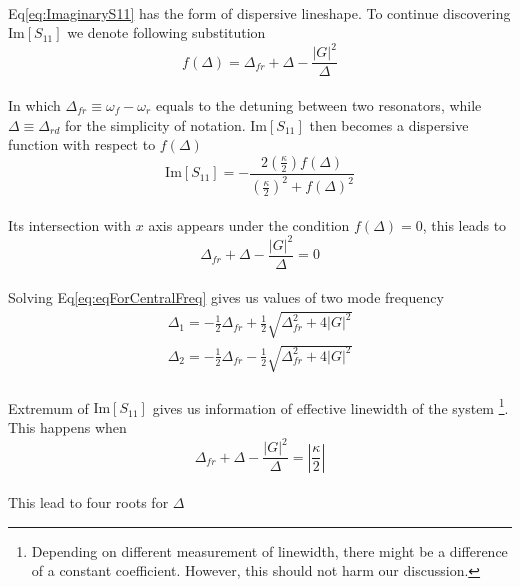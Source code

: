 \\
Eq\ref{eq:ImaginaryS11} has the form of dispersive lineshape. To continue discovering $\mathrm{Im}[S_{11}]$ we denote following substitution
\\
\begin{equation}
	f(\Delta) = \Delta_{fr} + \Delta - \frac{|G|^2}{\Delta}
\end{equation}
\\
In which $\Delta_{fr} \equiv \omega_f - \omega_r$ equals to the detuning between two resonators, while $\Delta \equiv \Delta_{rd}$ for the simplicity of notation. $\mathrm{Im}[S_{11}]$ then becomes a dispersive function with respect to $f(\Delta)$
\\
\begin{equation}
	\mathrm{Im}[S_{11}] = - \frac{2 (\frac{\kappa}{2}) f(\Delta)}{(\frac{\kappa}{2})^2 + f(\Delta)^2}
\end{equation}
\\
Its intersection with $x$ axis appears under the condition $f(\Delta) = 0$, this leads to
\\
\begin{equation}
	\Delta_{fr} + \Delta - \frac{|G|^2}{\Delta} = 0
	\label{eq:eqForCentralFreq}
\end{equation}
\\
Solving Eq\ref{eq:eqForCentralFreq} gives us values of two mode frequency
\\
\begin{equation} \begin{split}
	\Delta_1 = -\frac{1}{2} \Delta_{fr} + \frac{1}{2} \sqrt{\Delta_{fr}^2 + 4|G|^2} \\
	\Delta_2 = -\frac{1}{2} \Delta_{fr} - \frac{1}{2} \sqrt{\Delta_{fr}^2 + 4|G|^2}
	\label{eq:centerSolution}
\end{split} \end{equation}
\\
Extremum of $\mathrm{Im}[S_{11}]$ gives us information of effective linewidth of the system \footnote{Depending on different measurement of linewidth, there might be a difference of a constant coefficient. However, this should not harm our discussion.}. This happens when
\\
\begin{equation}
	\Delta_{fr} + \Delta - \frac{|G|^2}{\Delta} = \left|\frac{\kappa}{2}\right|
\end{equation}
\\
This lead to four roots for $\Delta$
